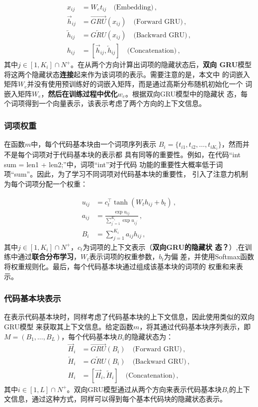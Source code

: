 \begin{align}
	x_{ij} &= W_e t_{ij} \quad\text{(Embedding)} \,, \\
	\overrightarrow{h}_{ij} &= \overrightarrow{GRU}(x_{ij}) 
	\quad\text{(Forward GRU)} \,, \\
       \overleftarrow{h}_{ij} &= \overleftarrow{GRU}(x_{ij}) 
       \quad\text{(Backward GRU)} \,, \\
       h_{ij} &= [\overrightarrow{h}_{ij}, \overleftarrow{h}_{ij}] 
       \quad\text{(Concatenation)} \,,
\end{align}
\label{eq:token_encoder}
其中$j\in [1, K_i] \cap N^+$。在从两个方向计算出词项的隐藏状态后，\textbf{双向
GRU}模型将这两个隐藏状态\textbf{连接}起来作为该词项的表示。需要注意的是，本文中
的词嵌入矩阵$W_e$并没有使用预训练好的词嵌入矩阵，而是通过高斯分布随机初始化一个
词嵌入矩阵$W_e$，\textbf{然后在训练过程中优化$w_e$}。根据双向GRU模型中的隐藏状
态，每个词项得到一个向量表示，该表示考虑了两个方向的上下文信息。

\subsubsection{\textbf{词项权重}}
在函数$m$中，每个代码基本块由一个词项序列表示
$B_i=\{t_{i1},t_{i2},\dots,t_{iK_i}\}$，然而并不是每个词项对于代码基本块的表示都
具有同等的重要性。例如，在代码``int sum = len1 + len2;''中，词项``int''对于代码
功能的重要性大概率低于词项``sum''。因此，为了学习不同词项对代码基本块的重要性，
引入了注意力机制为每个词项分配一个权重：

\begin{align}
    u_{ij} &= c_t^\top \tanh(W_t h_{ij} + b_t) \,, \\
    a_{ij} &= \frac{\exp{u_{ij}}}{\sum_{j^\prime=1}^{K_i} \exp{u_{ij^\prime}}} 
    \,, \\
    B_{i} &= \sum_{j=1}^{K_i} a_{ij}h_{ij} \,,
\end{align}
\label{eq:token_attn}
其中$j\in [1, K_i] \cap N^+$，$c_t$为词项的上下文表示（\textbf{双向GRU的隐藏状
态？}）,在训练中通过\textbf{联合分布学习}，$W_t$表示词项的权重参数，$b_t$为偏
差，并使用Softmax函数将权重规则化。最后，每个代码基本块通过组成该基本块的词项的
权重和来表示。

\subsubsection{代码基本块表示}
在表示代码基本块时，同样考虑了代码基本块的上下文信息，因此使用类似的双向GRU模型
来获取其上下文信息。给定函数$m$，将其通过代码基本块序列表示，即$M = (B_1, \dots,
B_L)$，每个代码基本块$B_i$的隐藏状态为：
\begin{align}
    \overrightarrow{H}_i &= \overrightarrow{GRU}(B_{i}) 
\quad\text{(Forward GRU)} \,, \\
    \overleftarrow{H}_i &= \overleftarrow{GRU}(B_i) 
\quad\text{(Backward GRU)} \,, \\
    H_i &= [\overrightarrow{H}_i, \overleftarrow{H}_i] 
\quad\text{(Concatenation)} \,,
\end{align}
\label{eq:block_encoder}
其中$i\in [1, L] \cap N^+$。双向GRU模型通过从两个方向来表示代码基本块$B_i$的上下
文信息，通过这种方式，同样可以得到每个基本代码块的隐藏状态表示。

